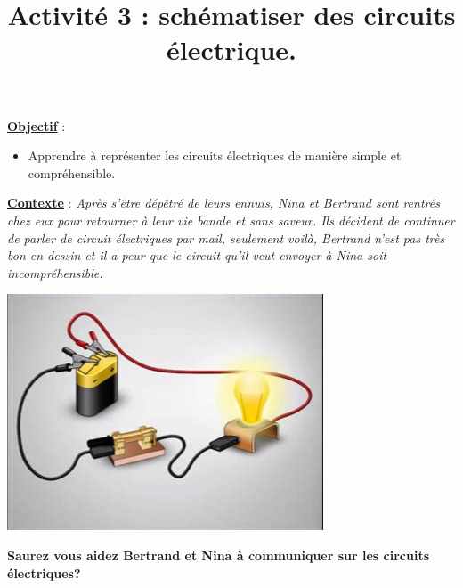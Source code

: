 \documentclass[11pt]{article}
\newcommand{\titreActivite}{\huge Activité 3 : schématiser des circuits électrique.} %
\newcommand{\objectif}{ 	
	
	\begin{itemize}
		\item Apprendre à représenter les 
		circuits électriques de manière simple et compréhensible.
	\end{itemize}
} %
\newcommand{\contexte}{ 
	Après s'être dépêtré de leurs ennuis, Nina et Bertrand sont rentrés chez eux pour retourner à leur vie banale et sans saveur.
	Ils décident de continuer de parler de circuit électriques par mail, seulement voilà, Bertrand n'est pas très bon en dessin
	et il a peur que le circuit qu'il veut envoyer à Nina soit incompréhensible.
 }
\newcommand{\resumeContexte}{Saurez vous aidez Bertrand et Nina à communiquer sur les circuits électriques?} %
\begin{document}
\date{}
\title{\titreActivite}
\maketitle %


\underline{\textbf{Objectif}} :  \vspace{2pt}
\objectif

\vspace{8pt}

\underline{\textbf{Contexte}} :  \textit{\contexte}

\begin{center}
	\includegraphics[width=0.35\columnwidth]{activité.png} %
\end{center}

\textbf{\resumeContexte}
\vspace{-12pt}


\end{document}
